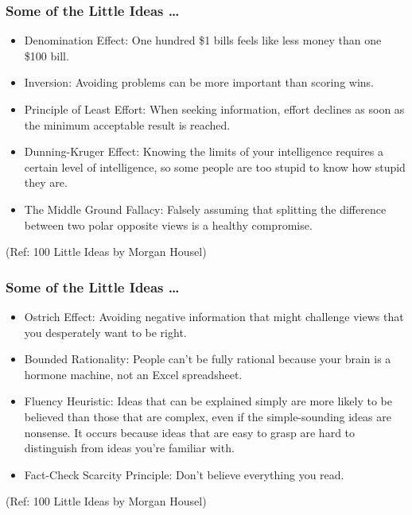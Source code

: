 \begin{frame}[fragile]\frametitle{ Some of the Little Ideas \ldots}

	\begin{itemize}
	\item Denomination Effect: One hundred \$1 bills feels like less money than one \$100 bill.
	\item Inversion: Avoiding problems can be more important than scoring wins.
	\item Principle of Least Effort: When seeking information, effort declines as soon as the minimum acceptable result is reached.
	\item Dunning-Kruger Effect: Knowing the limits of your intelligence requires a certain level of intelligence, so some people are too stupid to know how stupid they are.
	\item The Middle Ground Fallacy: Falsely assuming that splitting the difference between two polar opposite views is a healthy compromise.
	\end{itemize}

{\tiny (Ref: 100 Little Ideas by Morgan Housel)}

\end{frame}

\begin{frame}[fragile]\frametitle{ Some of the Little Ideas \ldots}

	\begin{itemize}
	\item Ostrich Effect: Avoiding negative information that might challenge views that you desperately want to be right.
	\item Bounded Rationality: People can’t be fully rational because your brain is a hormone machine, not an Excel spreadsheet.
	\item Fluency Heuristic: Ideas that can be explained simply are more likely to be believed than those that are complex, even if the simple-sounding ideas are nonsense. It occurs because ideas that are easy to grasp are hard to distinguish from ideas you’re familiar with.
	\item Fact-Check Scarcity Principle: Don’t believe everything you read.
	\end{itemize}

{\tiny (Ref: 100 Little Ideas by Morgan Housel)}

\end{frame}



